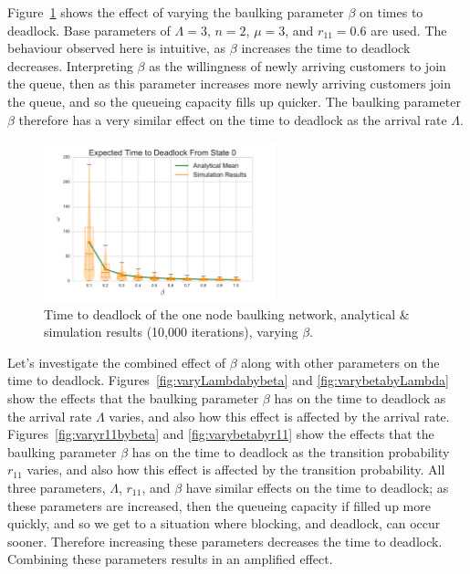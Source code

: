 \documentclass{article}
\begin{document}
Figure~\ref{fig:varybeta} shows the effect of varying the baulking parameter $\beta$ on times to deadlock.
Base parameters of $\Lambda = 3$, $n = 2$, $\mu = 3$, and $r_{11} = 0.6$ are used.
The behaviour observed here is intuitive, as $\beta$ increases the time to deadlock decreases.
Interpreting $\beta$ as the willingness of newly arriving customers to join the queue, then as this parameter increases more newly arriving customers join the queue, and so the queueing capacity fills up quicker.
The baulking parameter $\beta$ therefore has a very similar effect on the time to deadlock as the arrival rate $\Lambda$.

\begin{figure}
    \begin{center}
        \includegraphics[width=0.6\textwidth]{img/vary_beta.pdf}
    \end{center}
    \caption{Time to deadlock of the one node baulking network, analytical \& simulation results (10,000 iterations), varying $\beta$.}
    \label{fig:varybeta}
\end{figure}

Let's investigate the combined effect of $\beta$ along with other parameters on the time to deadlock.
Figures~\ref{fig:varyLambdabybeta} and \ref{fig:varybetabyLambda} show the effects that the baulking parameter $\beta$ has on the time to deadlock as the arrival rate $\Lambda$ varies, and also how this effect is affected by the arrival rate.
Figures~\ref{fig:varyr11bybeta} and \ref{fig:varybetabyr11} show the effects that the baulking parameter $\beta$ has on the time to deadlock as the transition probability $r_{11}$ varies, and also how this effect is affected by the transition probability.
All three parameters, $\Lambda$, $r_{11}$, and $\beta$ have similar effects on the time to deadlock; as these parameters are increased, then the queueing capacity if filled up more quickly, and so we get to a situation where blocking, and deadlock, can occur sooner.
Therefore increasing these parameters decreases the time to deadlock.
Combining these parameters results in an amplified effect.
\end{document}

